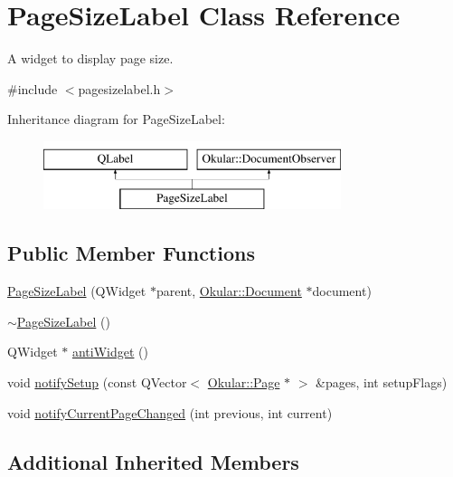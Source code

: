 \hypertarget{classPageSizeLabel}{\section{Page\+Size\+Label Class Reference}
\label{classPageSizeLabel}
}


A widget to display page size.  




{\ttfamily \#include $<$pagesizelabel.\+h$>$}

Inheritance diagram for Page\+Size\+Label\+:\begin{figure}[H]
\begin{center}
\leavevmode
\includegraphics[height=2.000000cm]{classPageSizeLabel}
\end{center}
\end{figure}
\subsection*{Public Member Functions}
\begin{DoxyCompactItemize}
\item 
\hyperlink{classPageSizeLabel_a7e8aa6c797efc102918e609aaee75e7a}{Page\+Size\+Label} (Q\+Widget $\ast$parent, \hyperlink{classOkular_1_1Document}{Okular\+::\+Document} $\ast$document)
\item 
\hyperlink{classPageSizeLabel_af538105f0ac576f0d8505fdf6411e02d}{$\sim$\+Page\+Size\+Label} ()
\item 
Q\+Widget $\ast$ \hyperlink{classPageSizeLabel_a360709d07f63423e0ede2e6572b4aaf1}{anti\+Widget} ()
\item 
void \hyperlink{classPageSizeLabel_a2c093e6519c7c6efa95252ab5a5c613a}{notify\+Setup} (const Q\+Vector$<$ \hyperlink{classOkular_1_1Page}{Okular\+::\+Page} $\ast$ $>$ \&pages, int setup\+Flags)
\item 
void \hyperlink{classPageSizeLabel_a67ef64ec40dfd0d45410ab7efa250427}{notify\+Current\+Page\+Changed} (int previous, int current)
\end{DoxyCompactItemize}
\subsection*{Additional Inherited Members}


